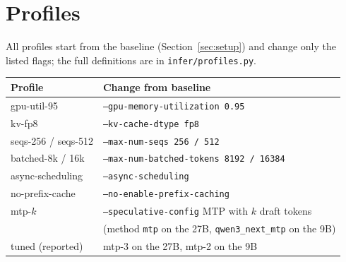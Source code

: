 \documentclass[11pt]{article}
\begin{document}
\section{Profiles}\label{app:profiles}
All profiles start from the baseline (Section~\ref{sec:setup}) and change only the listed flags; the full definitions are in \texttt{infer/profiles.py}.
\begin{center}\small\begin{tabular}{ll}\toprule
Profile & Change from baseline \\ \midrule
gpu-util-95 & \texttt{--gpu-memory-utilization 0.95} \\
kv-fp8 & \texttt{--kv-cache-dtype fp8} \\
seqs-256 / seqs-512 & \texttt{--max-num-seqs 256 / 512} \\
batched-8k / 16k & \texttt{--max-num-batched-tokens 8192 / 16384} \\
async-scheduling & \texttt{--async-scheduling} \\
no-prefix-cache & \texttt{--no-enable-prefix-caching} \\
mtp-$k$ & \texttt{--speculative-config} MTP with $k$ draft tokens \\
 & (method \texttt{mtp} on the 27B, \texttt{qwen3\_next\_mtp} on the 9B) \\
tuned (reported) & mtp-3 on the 27B, mtp-2 on the 9B \\ \bottomrule
\end{tabular}\end{center}
\end{document}
